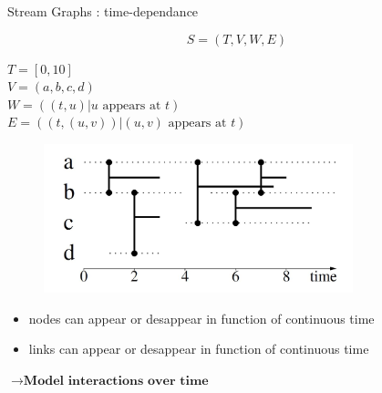 \documentclass[15pt]{beamer}
\begin{document}
\begin{frame}{Stream Graphs : time-dependance}

\[
	S=(T,V,W,E)
\]
\medskip

\begin{minipage}{0.4\textwidth}
\begin{footnotesize}
$T=[0,10]$\\
$V=(a,b,c,d)$\\
$W = ((t,u) | u \text{ appears at } t)$\\
$E = ((t,(u,v)) | (u,v) \text{ appears at } t)$
\end{footnotesize}
\end{minipage}
\begin{minipage}[r]{0.55\textwidth}
\begin{figure}
    \flushright
    \includegraphics[width=0.8\textwidth]{img/exampleStream.JPG}
    \label{fig:exstream}
\end{figure}
\end{minipage}
\medskip

\begin{itemize}
    \item nodes can appear or desappear in function of continuous time
    \item links can appear or desappear in function of continuous time
\end{itemize}
\smallskip
\centering
$\rightarrow \textbf{Model interactions over time}$





\end{frame}
\end{document}
